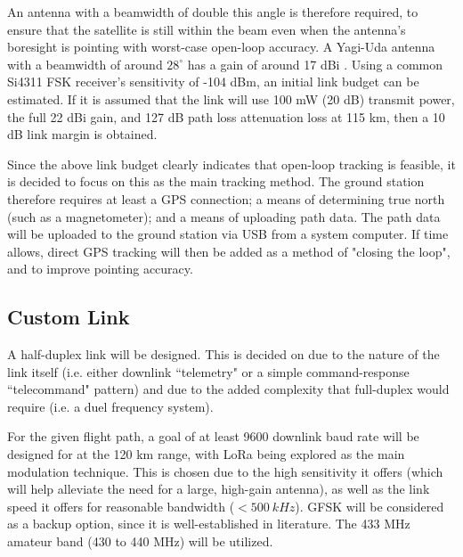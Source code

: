An antenna with a beamwidth of double this angle is therefore required, to ensure that the satellite is still within the beam even when the antenna's boresight is pointing with worst-case open-loop accuracy. A Yagi-Uda antenna with a beamwidth of around $28^\circ$ has a gain of around 17 dBi \cite{paper-yagiGainBeamwidth}. Using a common Si4311 FSK receiver's sensitivity of -104 dBm, an initial link budget can be estimated. If it is assumed that the link will use 100 mW (20 dB) transmit power, the full 22 dBi gain, and 127 dB path loss attenuation loss at 115 km, then a 10 dB link margin is obtained.

Since the above link budget clearly indicates that open-loop tracking is feasible, it is decided to focus on this as the main tracking method. The ground station therefore requires at least a GPS connection; a means of determining true north (such as a magnetometer); and a means of uploading path data. The path data will be uploaded to the ground station via USB from a system computer. If time allows, direct GPS tracking will then be added as a method of "closing the loop", and to improve pointing accuracy.

\subsection{Custom Link}
A half-duplex link will be designed. This is decided on due to the nature of the link itself (i.e. either downlink ``telemetry" or a simple command-response ``telecommand" pattern) and due to the added complexity that full-duplex would require (i.e. a duel frequency system).

For the given flight path, a goal of at least 9600 downlink baud rate will be designed for at the 120 km range, with LoRa being explored as the main modulation technique. This is chosen due to the high sensitivity it offers (which will help alleviate the need for a large, high-gain antenna), as well as the link speed it offers for reasonable bandwidth ($< \SI{500}{kHz}$). GFSK will be considered as a backup option, since it is well-established in literature. The 433 MHz amateur band (430 to 440 MHz) will be utilized.